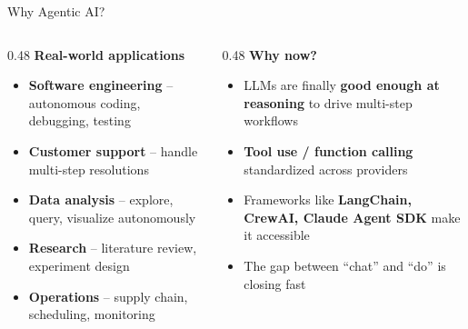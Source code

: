 \documentclass[aspectratio=169,10pt]{beamer}
\newcommand{\hl}[1]{\textcolor{ethteal}{\textbf{#1}}}
\begin{document}
\begin{frame}{Why Agentic AI?}
\begin{columns}[T]
\begin{column}{0.48\textwidth}
{\color{ethteal}\textbf{Real-world applications}}
\begin{itemize}
  \item \textbf{Software engineering} -- autonomous coding, debugging, testing
  \item \textbf{Customer support} -- handle multi-step resolutions
  \item \textbf{Data analysis} -- explore, query, visualize autonomously
  \item \textbf{Research} -- literature review, experiment design
  \item \textbf{Operations} -- supply chain, scheduling, monitoring
\end{itemize}
\end{column}
\begin{column}{0.48\textwidth}
{\color{ethteal}\textbf{Why now?}}
\begin{itemize}
  \item LLMs are finally \hl{good enough at reasoning} to drive multi-step workflows
  \item \textbf{Tool use / function calling} standardized across providers
  \item Frameworks like \textbf{LangChain, CrewAI, Claude Agent SDK} make it accessible
  \item The gap between ``chat'' and ``do'' is closing fast
\end{itemize}
\vspace{0.5em}
\end{column}
\end{columns}
\end{frame}
\end{document}
